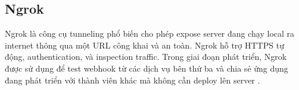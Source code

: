 \subsection{Ngrok}
Ngrok là công cụ tunneling phổ biến cho phép expose server đang chạy local ra internet thông qua một URL công khai và an toàn. Ngrok hỗ trợ HTTPS tự động, authentication, và inspection traffic. Trong giai đoạn phát triển, Ngrok được sử dụng để test webhook từ các dịch vụ bên thứ ba và chia sẻ ứng dụng đang phát triển với thành viên khác mà không cần deploy lên server \cite{ngrok_docs}.